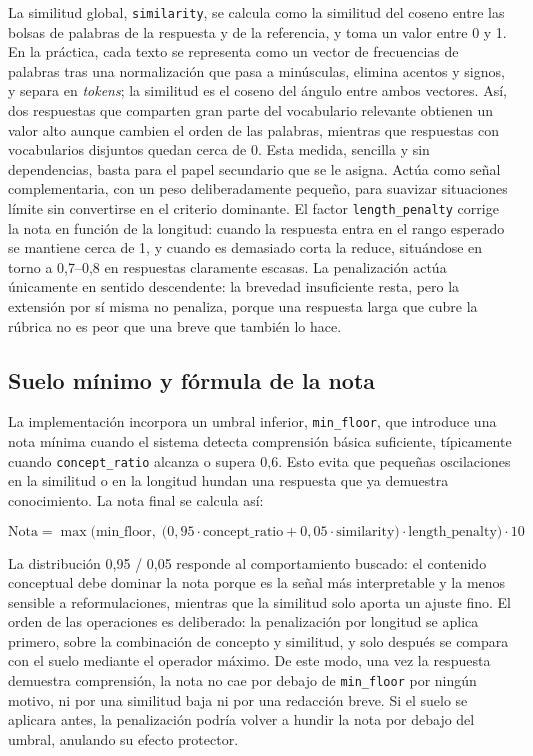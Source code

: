 La similitud global, \texttt{similarity}, se calcula como la similitud del coseno entre las bolsas de palabras de la respuesta y de la referencia, y toma un valor entre 0 y 1. En la práctica, cada texto se representa como un vector de frecuencias de palabras tras una normalización que pasa a minúsculas, elimina acentos y signos, y separa en \emph{tokens}; la similitud es el coseno del ángulo entre ambos vectores. Así, dos respuestas que comparten gran parte del vocabulario relevante obtienen un valor alto aunque cambien el orden de las palabras, mientras que respuestas con vocabularios disjuntos quedan cerca de 0. Esta medida, sencilla y sin dependencias, basta para el papel secundario que se le asigna. Actúa como señal complementaria, con un peso deliberadamente pequeño, para suavizar situaciones límite sin convertirse en el criterio dominante. El factor \texttt{length\_penalty} corrige la nota en función de la longitud: cuando la respuesta entra en el rango esperado se mantiene cerca de 1, y cuando es demasiado corta la reduce, situándose en torno a 0{,}7--0{,}8 en respuestas claramente escasas. La penalización actúa únicamente en sentido descendente: la brevedad insuficiente resta, pero la extensión por sí misma no penaliza, porque una respuesta larga que cubre la rúbrica no es peor que una breve que también lo hace.

\subsection{Suelo mínimo y fórmula de la nota}

La implementación incorpora un umbral inferior, \texttt{min\_floor}, que introduce una nota mínima cuando el sistema detecta comprensión básica suficiente, típicamente cuando \texttt{concept\_ratio} alcanza o supera 0{,}6. Esto evita que pequeñas oscilaciones en la similitud o en la longitud hundan una respuesta que ya demuestra conocimiento. La nota final se calcula así:

\begin{equation}
\mathrm{Nota} = \max\!\Big(\mathrm{min\_floor},\;\big(0{,}95\cdot\mathrm{concept\_ratio} + 0{,}05\cdot\mathrm{similarity}\big)\cdot\mathrm{length\_penalty}\Big)\cdot 10
\end{equation}

La distribución 0{,}95 / 0{,}05 responde al comportamiento buscado: el contenido conceptual debe dominar la nota porque es la señal más interpretable y la menos sensible a reformulaciones, mientras que la similitud solo aporta un ajuste fino. El orden de las operaciones es deliberado: la penalización por longitud se aplica primero, sobre la combinación de concepto y similitud, y solo después se compara con el suelo mediante el operador máximo. De este modo, una vez la respuesta demuestra comprensión, la nota no cae por debajo de \texttt{min\_floor} por ningún motivo, ni por una similitud baja ni por una redacción breve. Si el suelo se aplicara antes, la penalización podría volver a hundir la nota por debajo del umbral, anulando su efecto protector.

